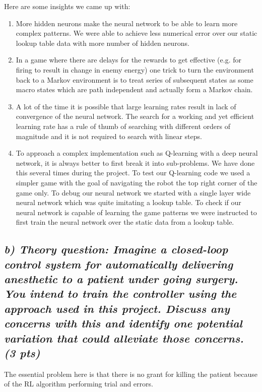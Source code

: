\documentclass[a4paper,12pt]{article}
\begin{document}
Here are some insights we came up with: 
\begin{enumerate}
\item More hidden neurons make the neural network to be able to learn more complex patterns. We were able to achieve less numerical error over our static lookup table data with more number of hidden neurons.

\item In a game where there are delays for the rewards to get effective (e.g. for firing to result in change in enemy energy) one trick to turn the environment back to a Markov environment is to treat series of subsequent states as some macro states which are path independent and actually form a Markov chain. 

\item A lot of the time it is possible that large learning rates result in lack of convergence of the neural network. The search for a working and yet efficient learning rate has a rule of thumb of searching with different orders of magnitude and it is not required to search with linear steps. 

\item To approach a complex implementation such as Q-learning with a deep neural network, it is always better to first break it into sub-problems. We have done this several times during the project. To test our Q-learning code we used a simpler game with the goal of navigating the robot the top right corner of the game only. To debug our neural network we started with a single layer wide neural network which was quite imitating a lookup table. To check if our neural network is capable of learning the game patterns we were instructed to first train the neural network over the static data from a lookup table. 

\end{enumerate}

\pagebreak
\subsection*{\emph{b) Theory question: Imagine a closed-loop control system for automatically delivering anesthetic to a patient under going surgery. You intend to train the controller using the approach used in this project. Discuss any concerns with this and identify one potential variation that could alleviate those concerns. (3 pts)}}

The essential problem here is that there is no grant for killing the patient because of the RL algorithm performing trial and errors. 
\end{document}

